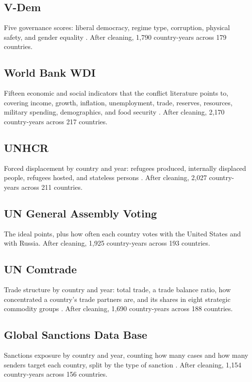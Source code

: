 \documentclass[stu,12pt,floatsintext]{apa7}
\begin{document}
\subsection{V-Dem}
Five governance scores: liberal democracy, regime type, corruption, physical safety, and gender equality \cite{pemstein2025}. After cleaning, 1,790 country-years across 179 countries.

\subsection{World Bank WDI}
Fifteen economic and social indicators that the conflict literature points to, covering income, growth, inflation, unemployment, trade, reserves, resources, military spending, demographics, and food security \cite{worldbank2024,obukhov2023}. After cleaning, 2,170 country-years across 217 countries.

\subsection{UNHCR}
Forced displacement by country and year: refugees produced, internally displaced people, refugees hosted, and stateless persons \cite{unhcr2024}. After cleaning, 2,027 country-years across 211 countries.

\subsection{UN General Assembly Voting}
The  ideal points, plus how often each country votes with the United States and with Russia. After cleaning, 1,925 country-years across 193 countries.

\subsection{UN Comtrade}
Trade structure by country and year: total trade, a trade balance ratio, how concentrated a country's trade partners are, and its shares in eight strategic commodity groups \cite{comtrade2024}. After cleaning, 1,690 country-years across 188 countries.

\subsection{Global Sanctions Data Base}
Sanctions exposure by country and year, counting how many cases and how many senders target each country, split by the type of sanction \cite{yalcin2025}. After cleaning, 1,154 country-years across 156 countries.
\end{document}
